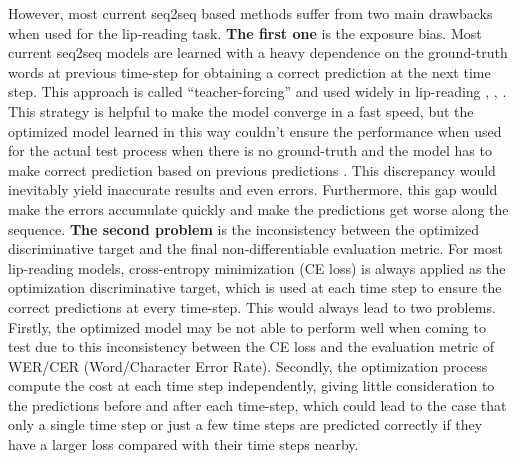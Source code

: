 \documentclass[a4paper, 10pt, conference]{ieeeconf}      %
\begin{document}
However, most current seq2seq based methods suffer from two main drawbacks when used for the lip-reading task. 
\textbf{The first one} is the exposure bias. Most current seq2seq models are learned with a heavy dependence on the ground-truth words at previous time-step for obtaining a correct prediction at the next time step. This approach is called ``teacher-forcing” \cite{Rennie} and used widely in lip-reading \cite{Chung2017}, \cite{Chung}, \cite{Afouras2018}. This strategy is helpful to make the model converge in a fast speed, but the optimized model learned in this way couldn't ensure the performance when used for the actual test process when there is no ground-truth and the model has to make correct prediction based on previous predictions \cite{Chopra2016}. This discrepancy would inevitably yield inaccurate results and even errors. Furthermore, this gap would make the errors accumulate quickly and make the predictions get worse along the sequence. %
\textbf{The second problem} is the inconsistency between the optimized discriminative target and the final non-differentiable evaluation metric. For most lip-reading models, cross-entropy minimization (CE loss) is always applied as the optimization discriminative target, which is used at each time step to ensure the correct predictions at every time-step. This would always lead to two problems. Firstly, the optimized model may be not able to perform well when coming to test due to this inconsistency between the CE loss and the evaluation metric of WER/CER (Word/Character Error Rate). Secondly, the optimization process compute the cost at each time step independently,  giving little consideration to the predictions before and after each time-step, which could lead to the case that only a single time step or just a few time steps are predicted correctly if they have a larger loss compared with their time steps nearby.


\end{document}
